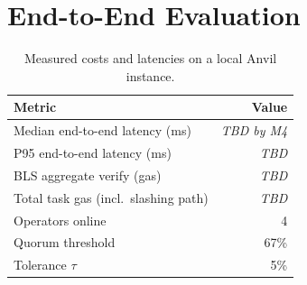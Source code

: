 \section{End-to-End Evaluation}
\label{sec:eval}




\begin{table}[t]
  \centering
  \caption{Measured costs and latencies on a local Anvil instance.}
  \label{tab:eval-numbers}
  \begin{tabular}{lr}
    \toprule
    Metric & Value \\
    \midrule
    Median end-to-end latency (ms)        & \textit{TBD by M4} \\
    P95 end-to-end latency (ms)           & \textit{TBD} \\
    BLS aggregate verify (gas)            & \textit{TBD} \\
    Total task gas (incl.\ slashing path) & \textit{TBD} \\
    Operators online                      & 4 \\
    Quorum threshold                      & 67\% \\
    Tolerance $\tau$                      & 5\% \\
    \bottomrule
  \end{tabular}
\end{table}


